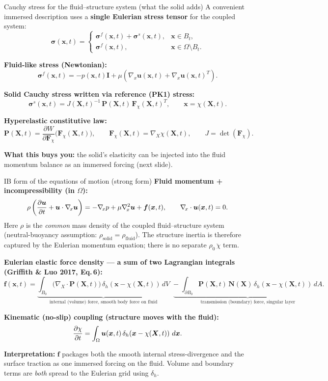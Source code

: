 \documentclass[aspectratio=169]{beamer}
\newcommand{\x}{\bm{x}}
\newcommand{\X}{\bm{X}}
\newcommand{\I}{\bm{I}}
\newcommand{\divX}{\nabla_{\!X}\!\cdot}
\newcommand{\sigmaC}{\bm{\sigma}} %
\newcommand{\Pten}{\bm{P}}        %
\newcommand{\Fdef}{\bm{F}_{\chi}} %
\newcommand{\Nvec}{\bm{N}}       %
\newcommand{\fEuler}{\bm{f}}     %
\newcommand{\uEuler}{\bm{u}}     %
\newcommand{\deltah}{\delta_h}   %
\begin{document}
\begin{frame}{Cauchy stress for the fluid--structure system (what the solid adds)}
\small
A convenient immersed description uses a \textbf{single Eulerian stress tensor} for the coupled system:
\[
\sigmaC(\x,t)=
\begin{cases}
\sigmaC^f(\x,t) + \sigmaC^s(\x,t), & \x\in B_t,\\[2pt]
\sigmaC^f(\x,t), & \x\in \Omega\setminus B_t.
\end{cases}
\]

\medskip
\textbf{Fluid-like stress (Newtonian):}
\[
\sigmaC^f(\x,t)= -p(\x,t)\I
+\mu\!\left(\nabla_{\!x}\uEuler(\x,t)+\nabla_{\!x}\uEuler(\x,t)^T\right).
\]

\medskip
\textbf{Solid Cauchy stress written via reference (PK1) stress:}
\[
\sigmaC^s(\x,t)= J(\X,t)^{-1}\,\Pten(\X,t)\,\Fdef(\X,t)^{T},
\qquad \x=\chi(\X,t).
\]

\medskip
\textbf{Hyperelastic constitutive law:}
\[
\Pten(\X,t)=\frac{\partial W}{\partial \Fdef}\Big(\Fdef(\X,t)\Big),\qquad
\Fdef(\X,t)=\nabla_{\!X}\chi(\X,t),\qquad J=\det(\Fdef).
\]

\medskip
\textbf{What this buys you:} the solid’s elasticity can be injected into the fluid momentum balance as an immersed forcing (next slide).
\end{frame}

\begin{frame}{IB form of the equations of motion (strong form)}
\small
\textbf{Fluid momentum + incompressibility (in \(\Omega\)):}
\[
\rho\left(\pdv{\uEuler}{t}+\uEuler\cdot\nabla_{\!x}\uEuler\right)
= -\nabla_{\!x}p + \mu\nabla_{\!x}^2\uEuler + \fEuler(\x,t),
\qquad \nabla_{\!x}\cdot\uEuler(\x,t)=0.
\]
\scriptsize Here \(\rho\) is the \emph{common} mass density of the coupled fluid--structure system (neutral-buoyancy assumption: \(\rho_{\text{solid}}=\rho_{\text{fluid}}\)). The structure inertia is therefore captured by the Eulerian momentum equation; there is no separate \(\rho_0\,\ddot{\chi}\) term.

\medskip
\small
\textbf{Eulerian elastic force density --- a sum of two Lagrangian integrals (Griffith \& Luo 2017, Eq.\,6):}
\[
\fEuler(\x,t)
= \underbrace{\int_{B_0}\big(\divX \Pten(\X,t)\big)\,\deltah\!\left(\x-\chi(\X,t)\right)\,dV}_{\text{internal (volume) force, smooth body force on fluid}}
\;\;\underbrace{-\;\int_{\partial B_0}\Pten(\X,t)\,\Nvec(\X)\,\deltah\!\left(\x-\chi(\X,t)\right)\,dA}_{\text{transmission (boundary) force, singular layer}}.
\]

\medskip
\textbf{Kinematic (no-slip) coupling (structure moves with the fluid):}
\[
\pdv{\chi}{t}(\X,t)
= \int_{\Omega}\uEuler(\x,t)\,\deltah\!\left(\x-\chi(\X,t)\right)\,d\x.
\]

\medskip
\textbf{Interpretation:} \(\fEuler\) packages both the smooth internal stress-divergence and the surface traction as one immersed forcing on the fluid. Volume and boundary terms are \emph{both} spread to the Eulerian grid using \(\deltah\).
\end{frame}
\end{document}
